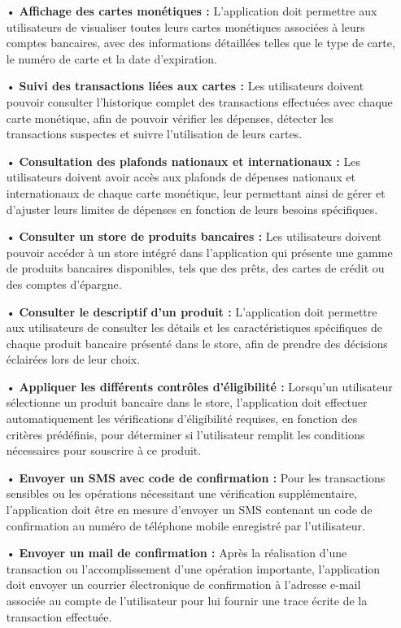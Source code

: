 \begin{itemize}
    \item[•] \textbf{Affichage des cartes monétiques :} L'application doit permettre aux utilisateurs de visualiser toutes leurs cartes monétiques associées à leurs comptes bancaires, avec des informations détaillées telles que le type de carte, le numéro de carte et la date d'expiration.
    \item[•] \textbf{Suivi des transactions liées aux cartes :} Les utilisateurs doivent pouvoir consulter l'historique complet des transactions effectuées avec chaque carte monétique, afin de pouvoir vérifier les dépenses, détecter les transactions suspectes et suivre l'utilisation de leurs cartes.
    \item[•] \textbf{Consultation des plafonds nationaux et internationaux :} Les utilisateurs doivent avoir accès aux plafonds de dépenses nationaux et internationaux de chaque carte monétique, leur permettant ainsi de gérer et d'ajuster leurs limites de dépenses en fonction de leurs besoins spécifiques.
    \item[•] \textbf{Consulter un store de produits bancaires :} Les utilisateurs doivent pouvoir accéder à un store intégré dans l'application qui présente une gamme de produits bancaires disponibles, tels que des prêts, des cartes de crédit ou des comptes d'épargne.
    \item[•] \textbf{Consulter le descriptif d'un produit :} L'application doit permettre aux utilisateurs de consulter les détails et les caractéristiques spécifiques de chaque produit bancaire présenté dans le store, afin de prendre des décisions éclairées lors de leur choix.
    \item[•] \textbf{Appliquer les différents contrôles d'éligibilité :} Lorsqu'un utilisateur sélectionne un produit bancaire dans le store, l'application doit effectuer automatiquement les vérifications d'éligibilité requises, en fonction des critères prédéfinis, pour déterminer si l'utilisateur remplit les conditions nécessaires pour souscrire à ce produit.
    \item[•] \textbf{Envoyer un SMS avec code de confirmation :} Pour les transactions sensibles ou les opérations nécessitant une vérification supplémentaire, l'application doit être en mesure d'envoyer un SMS contenant un code de confirmation au numéro de téléphone mobile enregistré par l'utilisateur.
    \item[•] \textbf{Envoyer un mail de confirmation :} Après la réalisation d'une transaction ou l'accomplissement d'une opération importante, l'application doit envoyer un courrier électronique de confirmation à l'adresse e-mail associée au compte de l'utilisateur pour lui fournir une trace écrite de la transaction effectuée.

\end{itemize}

